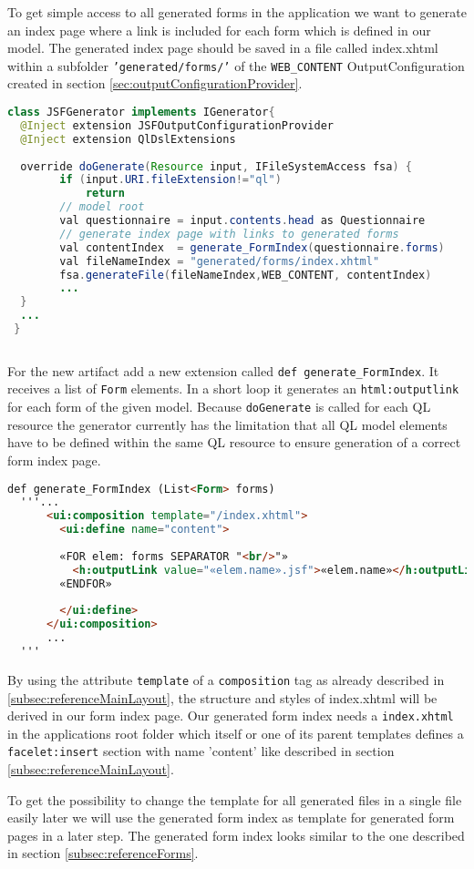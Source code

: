 To get simple access to all generated forms in the application
 we want to generate an index page where a link is included for each form which is defined
in our model.
The generated index page should be saved in a file called index.xhtml within a
subfolder \texttt{'generated/forms/'} of the \texttt{WEB\_CONTENT}
OutputConfiguration created in section \ref{sec:outputConfigurationProvider}.

\begin{lstlisting}[language=Java] 
class JSFGenerator implements IGenerator{
  @Inject extension JSFOutputConfigurationProvider
  @Inject extension QlDslExtensions
  
  override doGenerate(Resource input, IFileSystemAccess fsa) {
        if (input.URI.fileExtension!="ql")
            return
		// model root
        val questionnaire = input.contents.head as Questionnaire
		// generate index page with links to generated forms
        val contentIndex  = generate_FormIndex(questionnaire.forms)
        val fileNameIndex = "generated/forms/index.xhtml"
        fsa.generateFile(fileNameIndex,WEB_CONTENT, contentIndex)
        ...
  }
  ...
 }
      
\end{lstlisting}

For the new artifact add a new extension called \texttt{def
generate\_FormIndex}.
It receives a list of \texttt{Form} elements. In a short loop it generates an
\texttt{html:outputlink} for each form of the given model. Because
\texttt{doGenerate} is called for each QL resource the generator currently has the limitation that all
QL model elements have to be defined within the same QL resource to ensure
generation of a correct form index page.

\begin{lstlisting}[language=HTML] 
  def generate_FormIndex (List<Form> forms)
  '''...
      <ui:composition template="/index.xhtml">
        <ui:define name="content">
        
        «FOR elem: forms SEPARATOR "<br/>"»
          <h:outputLink value="«elem.name».jsf">«elem.name»</h:outputLink>
        «ENDFOR»
        
        </ui:define>
      </ui:composition>
      ... 
  '''
\end{lstlisting}

By using the attribute \texttt{template} of a \texttt{composition} tag as
already described in \ref{subsec:referenceMainLayout}, the structure and styles of
index.xhtml will be derived in our form index page. Our generated form index
needs a \texttt{index.xhtml} in the applications root folder which itself or one of its
parent templates defines a \texttt{facelet:insert} section with name 'content'
like described in section \ref{subsec:referenceMainLayout}.

To get the possibility to change the template for all generated files in
a single file easily later we will use the generated form index as template for
generated form pages in a later step. The generated form index looks similar to
the one described in section \ref{subsec:referenceForms}.
